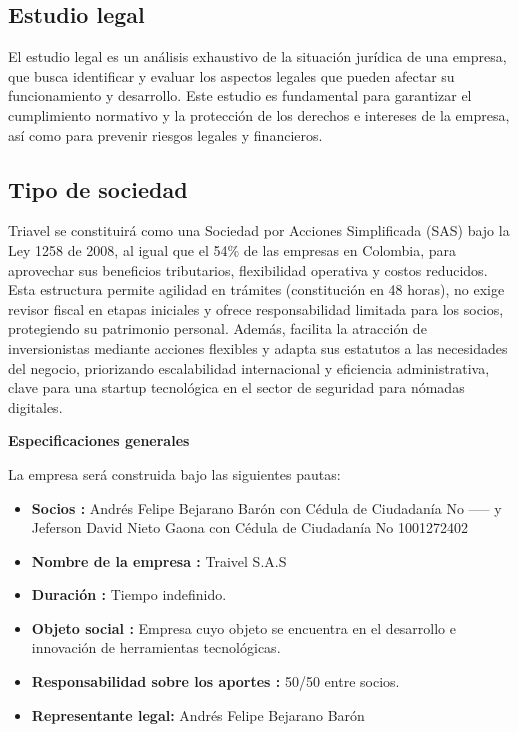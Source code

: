 \subsection{Estudio legal}
El estudio legal es un análisis exhaustivo de la situación jurídica de una empresa, que busca identificar y evaluar los aspectos legales que pueden afectar su funcionamiento y desarrollo. Este estudio es fundamental para garantizar el cumplimiento normativo y la protección de los derechos e intereses de la empresa, así como para prevenir riesgos legales y financieros.

\subsection*{Tipo de sociedad}
Triavel se constituirá como una Sociedad por Acciones Simplificada (SAS) bajo la Ley 1258 de 2008, al igual que el 54\% de las empresas en Colombia, para aprovechar sus beneficios tributarios, flexibilidad operativa y costos reducidos. Esta estructura permite agilidad en trámites (constitución en 48 horas), no exige revisor fiscal en etapas iniciales y ofrece responsabilidad limitada para los socios, protegiendo su patrimonio personal. Además, facilita la atracción de inversionistas mediante acciones flexibles y adapta sus estatutos a las necesidades del negocio, priorizando escalabilidad internacional y eficiencia administrativa, clave para una startup tecnológica en el sector de seguridad para nómadas digitales.

\textbf{Especificaciones generales}
\newline

La empresa será construida bajo las siguientes pautas:

\begin{itemize}
    \item \textbf{Socios : } Andrés Felipe Bejarano Barón con Cédula de Ciudadanía No ----- y Jeferson David Nieto Gaona con Cédula de Ciudadanía No 1001272402 
    \item \textbf{Nombre de la empresa :} Traivel S.A.S
    \item \textbf{Duración :} Tiempo indefinido.
    \item \textbf{Objeto social :} Empresa cuyo objeto se encuentra en el desarrollo e innovación de herramientas tecnológicas.
    \item \textbf{Responsabilidad sobre los aportes :} 50/50 entre socios.
    \item \textbf{Representante legal: } Andrés Felipe Bejarano Barón
\end{itemize}

